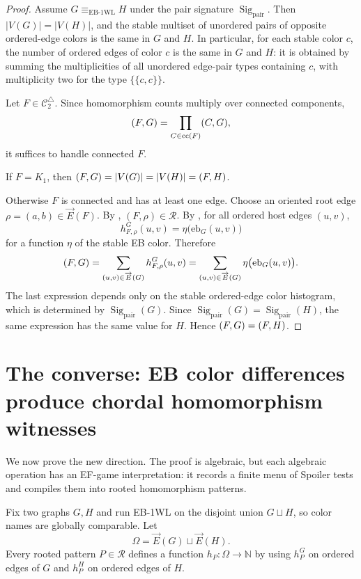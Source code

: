 \documentclass[11pt]{article}
\let\hom\relax
\DeclareMathOperator{\hom}{hom}
\DeclareMathOperator{\Sig}{Sig}
\newcommand{\N}{\mathbb{N}}
\newcommand{\cC}{\mathcal{C}}
\newcommand{\cR}{\mathcal{R}}
\newcommand{\vecE}{\overrightarrow{E}}
\newcommand{\mset}[1]{\{\!\{#1\}\!\}}
\begin{document}
\begin{proof}
Assume $G\equiv_{\mathrm{EB\text{-}1WL}}H$ under the pair signature $\Sig_{\mathrm{pair}}$.  Then $|V(G)|=|V(H)|$, and the stable multiset of unordered pairs of opposite ordered-edge colors is the same in $G$ and $H$.  In particular, for each stable color $c$, the number of ordered edges of color $c$ is the same in $G$ and $H$: it is obtained by summing the multiplicities of all unordered edge-pair types containing $c$, with multiplicity two for the type $\mset{c,c}$.

Let $F\in\cC_2^\triangle$.  Since homomorphism counts multiply over connected components,
\[
\hom(F,G)=\prod_{C\in\mathrm{cc}(F)}\hom(C,G),
\]
it suffices to handle connected $F$.

If $F=K_1$, then $\hom(F,G)=|V(G)|=|V(H)|=\hom(F,H)$.

Otherwise $F$ is connected and has at least one edge.  Choose an oriented root edge $\rho=(a,b)\in\vecE(F)$.  By , $(F,\rho)\in\cR$.  By , for all ordered host edges $(u,v)$,
\[
h_{F,\rho}^G(u,v)=\eta\bigl(\mathrm{eb}_G(u,v)\bigr)
\]
for a function $\eta$ of the stable EB color.  Therefore
\[
\hom(F,G)=\sum_{(u,v)\in\vecE(G)} h_{F,\rho}^G(u,v)
=\sum_{(u,v)\in\vecE(G)}\eta\bigl(\mathrm{eb}_G(u,v)\bigr).
\]
The last expression depends only on the stable ordered-edge color histogram, which is determined by $\Sig_{\mathrm{pair}}(G)$.  Since $\Sig_{\mathrm{pair}}(G)=\Sig_{\mathrm{pair}}(H)$, the same expression has the same value for $H$.  Hence $\hom(F,G)=\hom(F,H)$.
\end{proof}

\section{The converse: EB color differences produce chordal homomorphism witnesses}
\label{sec:converse}

We now prove the new direction.  The proof is algebraic, but each algebraic operation has an EF-game interpretation: it records a finite menu of Spoiler tests and compiles them into rooted homomorphism patterns.

Fix two graphs $G,H$ and run EB-1WL on the disjoint union $G\sqcup H$, so color names are globally comparable.  Let
\[
\Omega=\vecE(G)\sqcup \vecE(H).
\]
Every rooted pattern $P\in\cR$ defines a function $h_P:\Omega\to\N$ by using $h_P^G$ on ordered edges of $G$ and $h_P^H$ on ordered edges of $H$.
\end{document}
